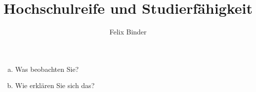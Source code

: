 \documentclass{beamer}%
\title{Hochschulreife und Studierfähigkeit}
\author[Felix Binder]{Felix Binder}
\begin{document}

\begin{frame}
\begin{enumerate} [a)]
\item Was beobachten Sie?
\item Wie erklären Sie sich das?
\end{enumerate}%
\end{frame}
\end{document}
